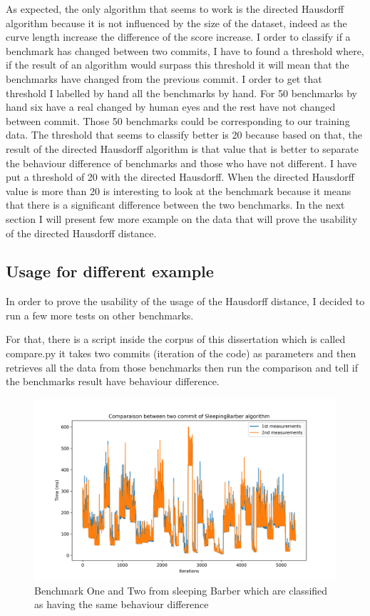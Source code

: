 \documentclass{article}
\begin{document}
As expected, the only algorithm that seems to work is the directed Hausdorff algorithm because it is not influenced by the size of the dataset, indeed as the curve length increase the difference of the score increase. 
I order to classify if a benchmark has changed between two commits, I have to found a threshold where, if the result of an algorithm would surpass this threshold it will mean that the benchmarks have changed from the previous commit. I order to get that threshold I labelled by hand all the benchmarks by hand. For 50 benchmarks by hand six have a real changed by human eyes and the rest have not changed between commit. Those 50 benchmarks could be corresponding to our training data. The threshold that seems to classify better is 20 because based on that, the result of the directed Hausdorff algorithm is that value that is better to separate the behaviour difference of benchmarks and those who have not different.
I have put a threshold of 20 with the directed Hausdorff. When the directed Hausdorff value is more than 20 is interesting to look at the benchmark because it means that there is a significant difference between the two benchmarks. In the next section I will present few more example on the data that will prove the usability of the directed Hausdorff distance. 


\subsection{Usage for different example}


In order to prove the usability of the usage of the Hausdorff distance, I decided to run a few more tests on other benchmarks.

For that, there is a script inside the corpus of this dissertation which is called compare.py it takes two commits (iteration of the code) as parameters and then retrieves all the data from those benchmarks then run the comparison and tell if the benchmarks result have behaviour difference. \\

\begin{figure}[]
    \centering
    \includegraphics[width=1\textwidth]{images/plot_SleepingBarber_4.069999999999936.png}
    \caption{Benchmark One and Two from sleeping Barber which are classified as having the same behaviour difference}
    \label{fig:bench_1_2_1}
\end{figure}
\end{document}
